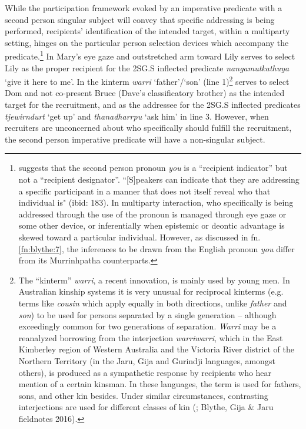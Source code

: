 \documentclass[output=paper,nonflat,colorlinks,citecolor=brown]{langsci/langscibook}
\begin{document}
While the participation framework evoked by an imperative predicate with a second person singular subject will convey that specific addressing is being performed, recipients’ identification of the intended target, within a multiparty setting, hinges on the particular person selection devices which accompany the predicate.\footnote{\cite[182]{Lerner2003} suggests that the second person pronoun \textit{you} is a “recipient indicator” but not a “recipient designator”. “[S]peakers can indicate that they are addressing a specific participant in a manner that does not itself reveal who that individual is" (ibid: 183). In multiparty interaction, who specifically is being addressed through the use of the pronoun is managed through eye gaze or some other device, or inferentially when epistemic or deontic advantage is skewed toward a particular individual. However, as discussed in fn. \ref{fn:blythe:7}, the inferences to be drawn from the English pronoun \textit{you} differ from its Murrinhpatha counterparts.} In  Mary’s eye gaze and outstretched arm toward Lily serves to select Lily as the proper recipient for the 2SG.S inflected predicate \textit{nangamutkathuya} ‘give it here to me’. In  the kinterm \textit{warri} ‘father’/‘son’ (line 1)\footnote{The “kinterm” \textit{warri}, a recent innovation, is mainly used by young men. In Australian kinship systems it is very unusual for reciprocal kinterms (e.g. terms like \textit{cousin} which apply equally in both directions, unlike \textit{father} and \textit{son}) to be used for persons separated by a single generation – although exceedingly common for two generations of separation. \textit{Warri} may be a reanalyzed borrowing from the interjection \textit{warriwarri}, which in the East Kimberley region of Western Australia and the Victoria River district of the Northern Territory (in the Jaru, Gija and Gurindji languages, amongst others), is produced as a sympathetic response by recipients who hear mention of a certain kinsman. In these languages, the term is used for fathers, sons, and other kin besides. Under similar circumstances, contrasting interjections are used for different classes of kin (\citealt[99]{Mcconvell1982}; Blythe, Gija \& Jaru fieldnotes 2016).} serves to select Dom and not co-present Bruce (Dave’s classificatory brother) as the intended target for the recruitment, and as the addressee for the 2SG.S inflected predicates \textit{tjewirndurt} ‘get up’ and \textit{thanadharrpu} ‘ask him’ in line 3. However, when recruiters are unconcerned about who specifically should fulfill the recruitment, the second person imperative predicate will have a non-singular subject.
\end{document}
